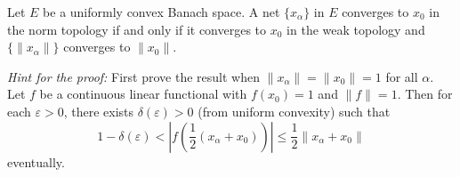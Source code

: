 Let $E$ be a uniformly convex Banach space. A net $\{x_\alpha\}$ in $E$ converges to $x_0$ in the norm topology if and only if it converges to $x_0$ in the weak topology and $\{\|x_\alpha\|\}$ converges to $\|x_0\|$.

\textit{Hint for the proof:} First prove the result when $\|x_\alpha\| = \|x_0\| = 1$ for all $\alpha$. Let $f$ be a continuous linear functional with $f(x_0) = 1$ and $\|f\| = 1$. Then for each $\varepsilon > 0$, there exists $\delta(\varepsilon) > 0$ (from uniform convexity) such that
$$1 - \delta(\varepsilon) < \left|f\left(\frac{1}{2}(x_\alpha + x_0)\right)\right| \leq \frac{1}{2}\|x_\alpha + x_0\|$$
eventually.
